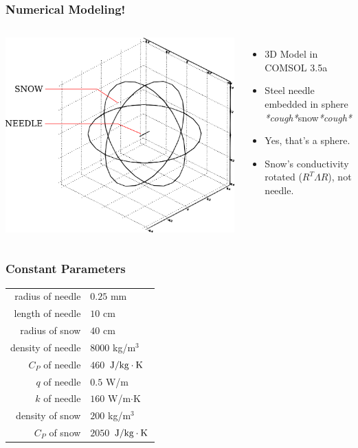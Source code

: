 \documentclass{beamer}
\begin{document}
\begin{frame}
\frametitle{Numerical Modeling!}
\begin{columns}[c]
    \includegraphics[width=\textwidth]{fig/domain.png}
    \begin{itemize}
    \item 3D Model in COMSOL 3.5a
    \item Steel needle embedded in sphere \emph{*cough*}snow\emph{*cough*}
    \item Yes, that's a sphere.
    \item Snow's conductivity rotated (\(R^T\Lambda R\)), not needle.
    \end{itemize}
\end{columns}
\end{frame}


\begin{frame}
\frametitle{Constant Parameters}
\centering
\begin{tabular}{r | l}
radius of needle & \(0.25\) mm\\
length of needle & \(10\) cm\\
radius of snow & \(40\) cm\\
\hline
density of needle & \(8000\) kg/\(\textrm{m}^3\)\\
\(C_P\) of needle & \(460\) \(\left.{\textrm{J}}\middle/{\textrm{kg}\cdot\textrm{K}}\right.\) \\
\(q\) of needle & \(0.5\) W/m\\
\(k\) of needle & \(160\) W/m\(\cdot\)K\\
\hline
density of snow & \(200\) kg/\(\textrm{m}^3\)\\
\(C_P\) of snow & \(2050\)  \(\left.{\textrm{J}}\middle/{\textrm{kg}\cdot\textrm{K}}\right.\)
\end{tabular}
\end{frame}
\end{document}
